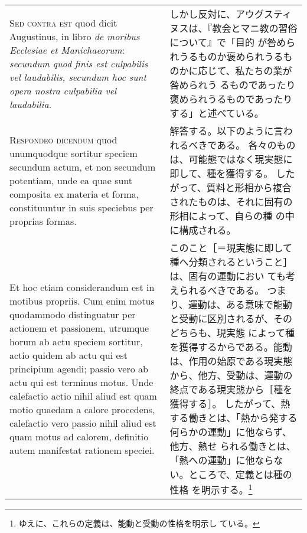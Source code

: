 \documentclass[10pt]{jsarticle} %
\begin{document}
\begin{longtable}{p{21em}p{21em}}
{\scshape Sed contra est} quod dicit Augustinus, in
libro {\itshape de moribus Ecclesiae et Manichaeorum}: {\itshape secundum quod finis est
culpabilis vel laudabilis, secundum hoc sunt opera nostra culpabilia vel
laudabilia}.

&


しかし反対に、アウグスティヌスは、『教会とマニ教の習俗について』で「目的
 が咎められうるものか褒められうるものかに応じて、私たちの業が咎められう
 るものであったり褒められうるものであったりする」と述べている。

\\


{\scshape Respondeo dicendum} quod unumquodque
sortitur speciem secundum actum, et non secundum potentiam, unde ea quae
sunt composita ex materia et forma, constituuntur in suis speciebus per
proprias formas. 



&

解答する。以下のように言われるべきである。
各々のものは、可能態ではなく現実態に即して、種を獲得する。
したがって、質料と形相から複合されたものは、それに固有の形相によって、自らの種
 の中に構成される。


\\



Et hoc etiam considerandum est in motibus propriis. Cum
enim motus quodammodo distinguatur per actionem et passionem, utrumque
horum ab actu speciem sortitur, actio quidem ab actu qui est principium
agendi; passio vero ab actu qui est terminus motus. Unde calefactio
actio nihil aliud est quam motio quaedam a calore procedens, calefactio
vero passio nihil aliud est quam motus ad calorem, definitio autem
manifestat rationem speciei. 



&

このこと［＝現実態に即して種へ分類されるということ］は、固有の運動におい
 ても考えられるべきである。
つまり、運動は、ある意味で能動と受動に区別されるが、そのどちらも、現実態
 によって種を獲得するからである。能動は、作用の始原である現実態
 から、他方、受動は、運動の終点である現実態から［種を獲得する］。
したがって、熱する働きとは、「熱から発する何らかの運動」に他ならず、他方、熱せ
 られる働きとは、「熱への運動」に他ならない。ところで、定義とは種の性格
 を明示する。\footnote{ゆえに、これらの定義は、能動と受動の性格を明示し
 ている。}


\\




\end{longtable}
\end{document}
